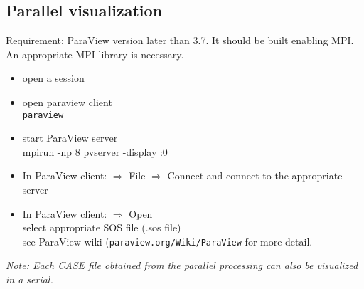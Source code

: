 \subsection{Parallel visualization}

Requirement: ParaView version later than 3.7. It should be built enabling MPI. An appropriate MPI library is necessary.

\begin{itemize}
\item open a session
\item open paraview client \\
\texttt{paraview}
\item start ParaView server \\
mpirun -np 8 pvserver -display :0
\item In ParaView client: $\Rightarrow$ File $\Rightarrow$ Connect and connect to the appropriate server
\item In ParaView client: $\Rightarrow$ Open\\
   select appropriate SOS file (.sos file)\\
   see ParaView wiki (\texttt{paraview.org/Wiki/ParaView} for more detail.
\end{itemize}

\emph{Note: Each CASE file obtained from the parallel processing can also be visualized in a serial.}
